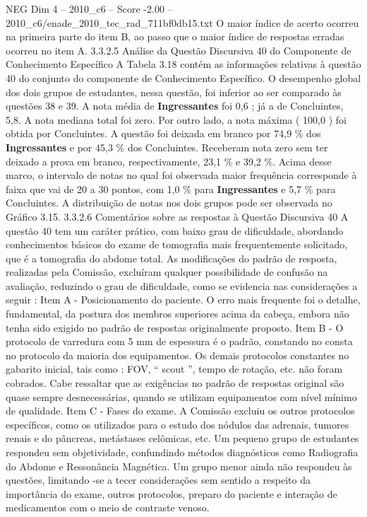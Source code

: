 \begin{textsample}{NEG Dim 4 – 2010\_c6 – Score -2.00 – 2010\_c6/enade\_2010\_tec\_rad\_711bf0db15.txt}
O maior índice de acerto ocorreu na primeira parte do item B, ao passo que o maior índice de respostas erradas ocorreu no item A. 3.3.2.5 Análise da Questão Discursiva 40 do Componente de Conhecimento Específico A Tabela 3.18 contém as informações relativas à questão 40 do conjunto do componente de Conhecimento Específico.
O desempenho global dos dois grupos de estudantes, nessa questão, foi inferior ao ser comparado às questões 38 e 39.
A nota média de \textbf{Ingressantes} foi 0,6 ; já a de Concluintes, 5,8.
A nota mediana total foi zero.
Por outro lado, a nota máxima ( 100,0 ) foi obtida por Concluintes.
A questão foi deixada em branco por 74,9 \% dos \textbf{Ingressantes} e por 45,3 \% dos Concluintes.
Receberam nota zero sem ter deixado a prova em branco, respectivamente, 23,1 \% e 39,2 \%.
Acima desse marco, o intervalo de notas no qual foi observada maior frequência corresponde à faixa que vai de 20 a 30 pontos, com 1,0 \% para \textbf{Ingressantes} e 5,7 \% para Concluintes.
A distribuição de notas nos dois grupos pode ser observada no Gráfico 3.15. 3.3.2.6 Comentários sobre as respostas à Questão Discursiva 40 A questão 40 tem um caráter prático, com baixo grau de dificuldade, abordando conhecimentos básicos do exame de tomografia mais frequentemente solicitado, que é a tomografia do abdome total.
As modificações do padrão de resposta, realizadas pela Comissão, excluíram qualquer possibilidade de confusão na avaliação, reduzindo o grau de dificuldade, como se evidencia nas considerações a seguir : Item A - Posicionamento do paciente.
O erro mais frequente foi o detalhe, fundamental, da postura dos membros superiores acima da cabeça, embora não tenha sido exigido no padrão de respostas originalmente proposto.
Item B - O protocolo de varredura com 5 mm de espessura é o padrão, constando no consta no protocolo da maioria dos equipamentos.
Os demais protocolos constantes no gabarito inicial, tais como : FOV, “ scout ”, tempo de rotação, etc. não foram cobrados.
Cabe ressaltar que as exigências no padrão de respostas original são quase sempre desnecessárias, quando se utilizam equipamentos com nível mínimo de qualidade.
Item C - Fases do exame.
A Comissão excluiu os outros protocolos específicos, como os utilizados para o estudo dos nódulos das adrenais, tumores renais e do pâncreas, metástases celômicas, etc.
Um pequeno grupo de estudantes respondeu sem objetividade, confundindo métodos diagnósticos como Radiografia do Abdome e Ressonância Magnética.
Um grupo menor ainda não respondeu às questões, limitando -se a tecer considerações sem sentido a respeito da importância do exame, outros protocolos, preparo do paciente e interação de medicamentos com o meio de contraste venoso.

\end{textsample}
